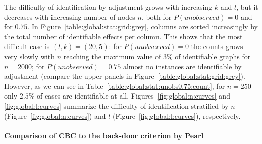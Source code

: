 The difficulty of identification by adjustment grows with increasing $k$ and $l$,
but it decreases with increasing number of nodes $n$,
both for $P(\textit{unobserved}) = 0$ and for $0.75$.
In Figure~\ref{table:global:stat:grid:grey}, 
columns are sorted increasingly by the total number of identifiable effects per column.
This shows that the most difficult case is $(l,k)=(20,5)$:
for $P(\textit{unobserved}) = 0$ the counts grows very slowly with $n$ 
reaching the maximum value of $3 \%$ of identifiable graphs for $n=2000$;
for  $P(\textit{unobserved}) = 0.75$ almost no instances are identifiable by adjustment 
(compare the upper panels in Figure~\ref{table:global:stat:grid:grey}).
However, as we can see in Table~\ref{table:global:stat:unobs0.75:count},
for $n=250$ only $2.5 \%$ of  cases are identifiable at all.
Figures~\ref{fig:global:n:curves} and \ref{fig:global:l:curves} summarize  the 
difficulty of identification stratified by $n$ (Figure~\ref{fig:global:n:curves}) 
and $l$ (Figure~\ref{fig:global:l:curves}), respectively. 




\paragraph{Comparison of CBC to the back-door criterion by Pearl}

